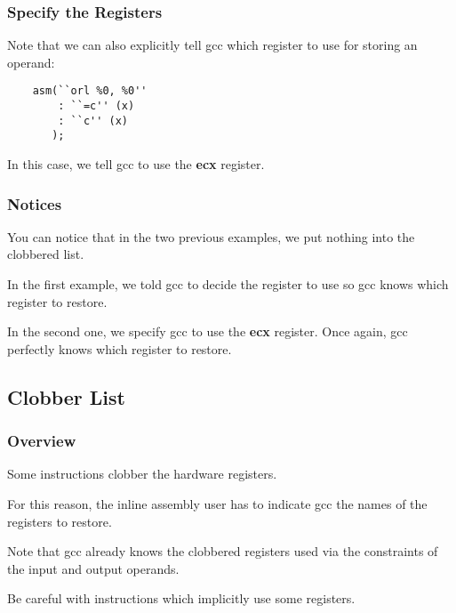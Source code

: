 {%

\begin{frame}[containsverbatim]
  \frametitle{Specify the Registers}

  Note that we can also explicitly tell gcc which register to use for
  storing an operand:

  \begin{verbatim}
    asm(``orl %0, %0''
        : ``=c'' (x)
        : ``c'' (x)
       );
  \end{verbatim}

  In this case, we tell gcc to use the \textbf{ecx} register.
\end{frame}


\begin{frame}
  \frametitle{Notices}

  You can notice that in the two previous examples, we put nothing into
  the clobbered list.

  \nl

  In the first example, we told gcc to decide the register to use so gcc
  knows which register to restore.

  \nl

  In the second one, we specify gcc to use the \textbf{ecx} register.
  Once again, gcc perfectly knows which register to restore.
\end{frame}

%
%

\subsection{Clobber List}


\begin{frame}
  \frametitle{Overview}

  Some instructions clobber the hardware registers.

  \nl

  For this reason, the inline assembly user has to indicate gcc the names
  of the registers to restore.

  \nl

  Note that gcc already knows the clobbered registers used via the
  constraints of the input and output operands.

  \nl

  Be careful with instructions which implicitly use some registers.
\end{frame}

}
